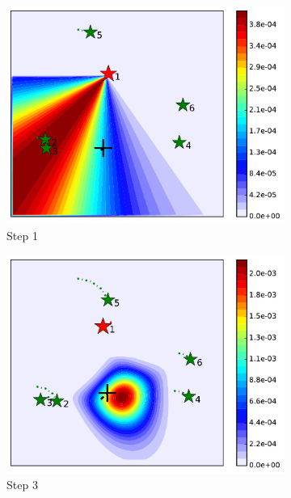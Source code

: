 \documentclass[journal]{IEEEtranTIE}
\theoremstyle{remark}
\begin{document}
\begin{figure}%
	\centering
	\begin{subfigure}[b]{0.23\textwidth}
		\includegraphics[width=\textwidth]{figures/brg_mov_sen_mov_tar_rbt1_step1}
		\caption{Step 1}\label{fig:mov_sen_mov_tar_sing1}
	\end{subfigure}
	\begin{subfigure}[b]{0.23\textwidth}
		\includegraphics[width=\textwidth]{figures/brg_mov_sen_mov_tar_rbt1_step3}
		\caption{Step 3}\label{fig:mov_sen_mov_tar_sing2}
	\end{subfigure}	
	\begin{subfigure}[b]{0.23\textwidth}

\end{subfigure}
\end{figure}
\end{document}
